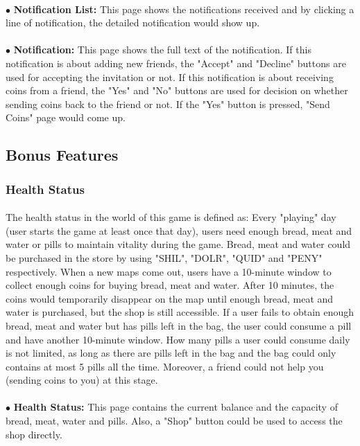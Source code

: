 \documentclass[paper=a4, fontsize=11pt]{scrartcl} %
\begin{document}
\paragraph{}$\bullet$ \textbf{Notification List: } This page shows the notifications received and by clicking a line of notification, the detailed notification would show up.
\paragraph{}$\bullet$ \textbf{Notification: } This page shows the full text of the notification. If this notification is about adding new friends, the "Accept" and "Decline" buttons are used for accepting the invitation or not. If this notification is about receiving coins from a friend, the "Yes" and "No" buttons are used for decision on whether sending coins back to the friend or not. If the "Yes" button is pressed, "Send Coins" page would come up.



\subsection{Bonus Features}
\subsubsection{Health Status}
\paragraph{} The health status in the world of this game is defined as: Every "playing" day (user starts the game at least once that day), users need enough bread, meat and water or pills to maintain vitality during the game. Bread, meat and water could be purchased in the store by using "SHIL", "DOLR", "QUID" and "PENY" respectively. When a new maps come out, users have a 10-minute window to collect enough coins for buying bread, meat and water. After 10 minutes, the coins would temporarily disappear on the map until enough bread, meat and water is purchased, but the shop is still accessible. If a user fails to obtain enough bread, meat and water but has pills left in the bag, the user could consume a pill and have another 10-minute window. How many pills a user could consume daily is not limited, as long as there are pills left in the bag and the bag could only contains at most 5 pills all the time. Moreover, a friend could not help you (sending coins to you) at this stage.
\paragraph{}$\bullet$ \textbf{Health Status: } This page contains the current balance and the capacity of bread, meat, water and pills. Also, a "Shop" button could be used to access the shop directly.
\end{document}
